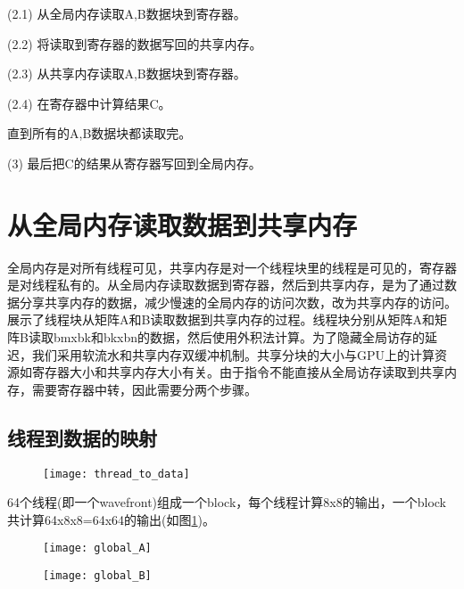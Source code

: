 \qquad(2.1) 从全局内存读取A,B数据块到寄存器。

\qquad(2.2) 将读取到寄存器的数据写回的共享内存。

\qquad(2.3) 从共享内存读取A,B数据块到寄存器。

\qquad(2.4) 在寄存器中计算结果C。

\qquad 直到所有的A,B数据块都读取完。

(3) 最后把C的结果从寄存器写回到全局内存。


\section{从全局内存读取数据到共享内存}
全局内存是对所有线程可见，共享内存是对一个线程块里的线程是可见的，寄存器是对线程私有的。从全局内存读取数据到寄存器，然后到共享内存，是为了通过数据分享共享内存的数据，减少慢速的全局内存的访问次数，改为共享内存的访问。展示了线程块从矩阵A和B读取数据到共享内存的过程。线程块分别从矩阵A和矩阵B读取bmxbk和bkxbn的数据，然后使用外积法计算。为了隐藏全局访存的延迟，我们采用软流水和共享内存双缓冲机制。共享分块的大小与GPU上的计算资源如寄存器大小和共享内存大小有关。由于指令不能直接从全局访存读取到共享内存，需要寄存器中转，因此需要分两个步骤。

\subsection{线程到数据的映射}

\begin{figure}[htbp]
	\centering
	\texttt{[image: thread\_to\_data]}
	\label{fig:thread_to_data}
\end{figure}

64个线程(即一个wavefront)组成一个block，每个线程计算8x8的输出，一个block共计算64x8x8=64x64的输出(如图\ref{fig:thread_to_data})。

\begin{figure}[htbp]
	\centering
	\texttt{[image: global\_A]}
	\label{fig:global_A}
\end{figure}

\begin{figure}[htbp]
	\centering
	\texttt{[image: global\_B]}
	\label{fig:global_B}
\end{figure}

